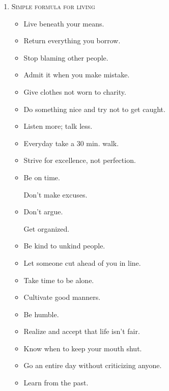 \documentclass{article}
\numberwithin{equation}{section}
\begin{document}
\begin{enumerate}
    Make sure you spend as much time as possible on the Internet arguing with strangers about politics.
    \item \textsc{Simple formula for living}
    \begin{itemize}
        \item Live beneath your means.
        \item Return everything you borrow.
        \item Stop blaming other people.
        \item Admit it when you make mistake.
        \item Give clothes not worn to charity.
        \item Do something nice and try not to get caught.
        \item Listen more; talk less.
        \item Everyday take a 30 min. walk.
        \item Strive for excellence, not perfection.
        \item Be on time.
        
        Don't make excuses.
        \item Don't argue.
        
        Get organized.
        \item Be kind to unkind people.
        \item Let someone cut ahead of you in line.
        \item Take time to be alone.
        \item Cultivate good manners.
        \item Be humble.
        \item Realize and accept that life isn't fair.
        \item Know when to keep your mouth shut.
        \item Go an entire day without criticizing anyone.
        \item Learn from the past.
        

\end{itemize}
\end{enumerate}
\end{document}
